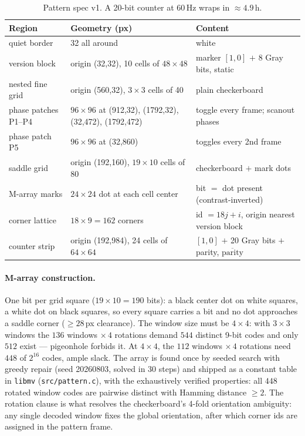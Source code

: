 \documentclass[11pt]{article}
\theoremstyle{definition}
\newcommand{\code}[1]{\texttt{#1}}
\begin{document}
\begin{table}[ht]
\centering
\scriptsize
\setlength{\tabcolsep}{4pt}
\begin{tabular}{l l l}
\toprule
Region & Geometry (px) & Content \\
\midrule
quiet border & 32 all around & white \\
version block & origin (32,32), 10 cells of $48\times48$ & marker $[1,0]$ $+$ 8 Gray bits, static \\
nested fine grid & origin (560,32), $3\times3$ cells of 40 & plain checkerboard \\
phase patches P1--P4 & $96\times96$ at (912,32), (1792,32), (32,472), (1792,472) & toggle every frame; scanout phases \\
phase patch P5 & $96\times96$ at (32,860) & toggles every 2nd frame \\
saddle grid & origin (192,160), $19\times10$ cells of 80 & checkerboard $+$ mark dots \\
M-array marks & $24\times24$ dot at each cell center & bit $=$ dot present (contrast-inverted) \\
corner lattice & $18\times9=162$ corners & id $= 18j+i$, origin nearest version block \\
counter strip & origin (192,984), 24 cells of $64\times64$ & $[1,0]$ $+$ 20 Gray bits $+$ parity, $\overline{\text{parity}}$ \\
\bottomrule
\end{tabular}
\caption{Pattern spec v1. A 20-bit counter at 60\,Hz wraps in
$\approx4.9$\,h.}
\label{tab:patternspec}
\end{table}

\paragraph{M-array construction.} One bit per grid square
($19\times10=190$ bits): a black center dot on white squares, a white
dot on black squares, so every square carries a bit and no dot
approaches a saddle corner ($\ge28$\,px clearance). The window size
must be $4\times4$: with $3\times3$ windows the $136$ windows
$\times\,4$ rotations demand $544$ distinct 9-bit codes and only $512$
exist --- pigeonhole forbids it. At $4\times4$, the $112$ windows
$\times\,4$ rotations need $448$ of $2^{16}$ codes, ample slack. The
array is found once by seeded search with greedy repair (seed 20260803,
solved in 30 steps) and shipped as a constant table in \code{libmv}
(\code{src/pattern.c}), with the exhaustively verified properties: all
$448$ rotated window codes are pairwise distinct with Hamming distance
$\ge2$. The rotation clause is what resolves the checkerboard's 4-fold
orientation ambiguity: any single decoded window fixes the global
orientation, after which corner ids are assigned in the pattern frame.
\end{document}
